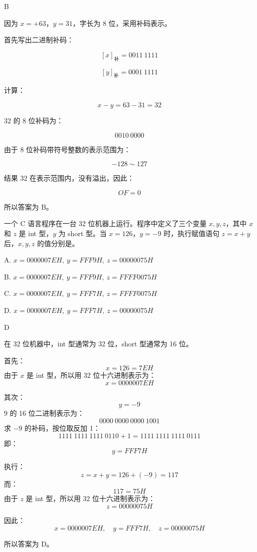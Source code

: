 \begin{answer}
B
\end{answer}

\begin{analysisenv}
因为 $x=+63$，$y=31$，字长为 $8$ 位，采用补码表示。

首先写出二进制补码：

\[
[x]_{\text{补}}=0011\ 1111
\]

\[
[y]_{\text{补}}=0001\ 1111
\]

计算：

\[
x-y=63-31=32
\]

$32$ 的 $8$ 位补码为：

\[
0010\ 0000
\]

由于 $8$ 位补码带符号整数的表示范围为：

\[
-128 \sim 127
\]

结果 $32$ 在表示范围内，没有溢出，因此：

\[
OF=0
\]

所以答案为 B。
\end{analysisenv}




\begin{question}
一个 C 语言程序在一台 32 位机器上运行。程序中定义了三个变量 $x,y,z$，其中 $x$ 和 $z$ 是 int 型，$y$ 为 short 型。当 $x=126$，$y=-9$ 时，执行赋值语句 $z=x+y$ 后，$x,y,z$ 的值分别是\underline{\hspace{3cm}}。

A. $x=0000007EH,\ y=FFF9H,\ z=00000075H$

B. $x=0000007EH,\ y=FFF9H,\ z=FFFF0075H$

C. $x=0000007EH,\ y=FFF7H,\ z=FFFF0075H$

D. $x=0000007EH,\ y=FFF7H,\ z=00000075H$
\end{question}

\begin{answer}
D
\end{answer}

\begin{analysisenv}
在 32 位机器中，int 型通常为 32 位，short 型通常为 16 位。

首先：
\[
x=126=7EH
\]
由于 $x$ 是 int 型，所以用 32 位十六进制表示为：
\[
x=0000007EH
\]

其次：
\[
y=-9
\]
$9$ 的 16 位二进制表示为：
\[
0000\ 0000\ 0000\ 1001
\]
求 $-9$ 的补码，按位取反加 1：
\[
1111\ 1111\ 1111\ 0110+1=1111\ 1111\ 1111\ 0111
\]
即：
\[
y=FFF7H
\]

执行：
\[
z=x+y=126+(-9)=117
\]
而：
\[
117=75H
\]
由于 $z$ 是 int 型，所以用 32 位十六进制表示为：
\[
z=00000075H
\]

因此：
\[
x=0000007EH,\quad y=FFF7H,\quad z=00000075H
\]

所以答案为 D。
\end{analysisenv}











